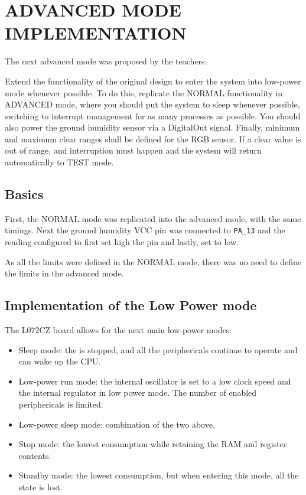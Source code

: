 \section{ADVANCED MODE IMPLEMENTATION}

The next advanced mode was proposed by the teachers: 

Extend the functionality of the original design to enter the system into low-power mode whenever possible. 
To do this, replicate the NORMAL functionality in ADVANCED mode, where you should put the system to sleep whenever possible, switching to interrupt management for 
as many processes as possible. You should also power the ground humidity sensor via a DigitalOut signal. Finally, minimum and maximum clear ranges shall be defined 
for the RGB sensor. If a clear value is out of range, and interruption must happen and the system will return automatically to TEST mode.

\subsection{Basics}

First, the NORMAL mode was replicated into the advanced mode, with the same timings. Next the ground humidity VCC pin was connected to \texttt{PA\_13} and the reading configured to first set high the pin and lastly, set to low. 

As all the limits were defined in the NORMAL mode, there was no need to define the limits in the advanced mode.

\subsection{Implementation of the Low Power mode}

The L072CZ board allows for the next main low-power modes:
\begin{itemize}
    \item Sleep mode: the  is stopped, and all the periphericals continue to operate and can wake up the CPU.
    \item Low-power run mode: the internal oscillator is set to a low clock speed and the internal regulator in low power mode. The number of enabled periphericals is limited.
    \item Low-power sleep mode: combination of the two above.
    \item Stop mode: the lowest consumption while retaining the RAM and register contents.
    \item Standby mode: the lowest consumption, but when entering this mode, all the state is lost.
\end{itemize}

